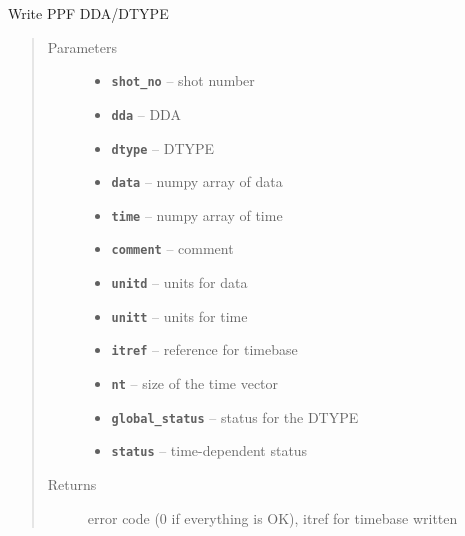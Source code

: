 \documentclass[letterpaper,10pt,english]{sphinxmanual}
\begin{document}
\begin{fulllineitems}
\label{ppf_write:ppf_write.write_ppf}
Write PPF DDA/DTYPE
\begin{quote}\begin{description}
\item[{Parameters}] \leavevmode\begin{itemize}
\item {} 
\textbf{\texttt{shot\_no}} -- shot number

\item {} 
\textbf{\texttt{dda}} -- DDA

\item {} 
\textbf{\texttt{dtype}} -- DTYPE

\item {} 
\textbf{\texttt{data}} -- numpy array of data

\item {} 
\textbf{\texttt{time}} -- numpy array of time

\item {} 
\textbf{\texttt{comment}} -- comment

\item {} 
\textbf{\texttt{unitd}} -- units for data

\item {} 
\textbf{\texttt{unitt}} -- units for time

\item {} 
\textbf{\texttt{itref}} -- reference for timebase

\item {} 
\textbf{\texttt{nt}} -- size of the time vector

\item {} 
\textbf{\texttt{global\_status}} -- status for the DTYPE

\item {} 
\textbf{\texttt{status}} -- time-dependent status

\end{itemize}

\item[{Returns}] \leavevmode
error code (0 if everything is OK), itref for timebase written

\end{description}\end{quote}

\end{fulllineitems}
\end{document}
